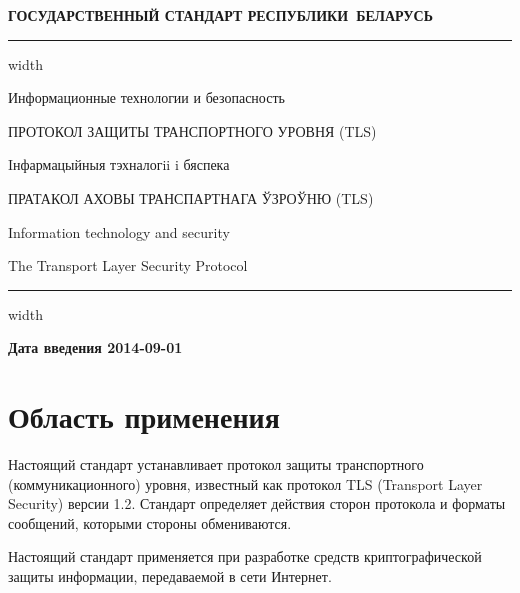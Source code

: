 \newpage
\setcounter{page}{1}
\pagestyle{headings}


\begin{center}
{\bfseries
ГОСУДАРСТВЕННЫЙ СТАНДАРТ РЕСПУБЛИКИ~БЕЛАРУСЬ
\vskip 2pt
\hrule width\textwidth

\vskip 9pt

Информационные технологии и безопасность

ПРОТОКОЛ ЗАЩИТЫ ТРАНСПОРТНОГО УРОВНЯ (TLS)


\vskip 9pt

Iнфармацыйныя тэхналогii i бяспека

ПРАТАКОЛ АХОВЫ ТРАНСПАРТНАГА ЎЗРОЎНЮ (TLS)

} %

\vskip 9pt

Information technology and security

The Transport Layer Security Protocol

\vskip 4pt                
\hrule width \textwidth
\end{center}

\mbox{}\hfill{\bfseries Дата введения 2014-09-01}

\chapter{Область применения}

Настоящий стандарт устанавливает протокол защиты транспортного 
(коммуникационного) уровня, известный как протокол TLS (Transport Layer 
Security) версии 1.2. Стандарт определяет действия сторон протокола и 
форматы сообщений, которыми стороны обмениваются. 

Настоящий стандарт применяется при разработке средств криптографической 
защиты информации, передаваемой в сети Интернет. 

